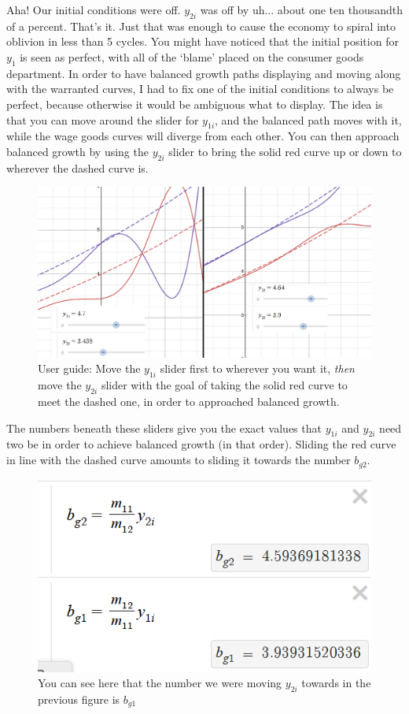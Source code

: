 \documentclass{article}
\theoremstyle{theorem}
\begin{document}
Aha! Our initial conditions were off. $y_{2i}$ was off by uh... about one ten thousandth of a percent. That's it. Just that was enough to cause the economy to spiral into oblivion in less than 5 cycles. You might have noticed that the initial position for $y_1$ is seen as perfect, with all of the `blame' placed on the consumer goods department. In order to have balanced growth paths displaying and moving along with the warranted curves, I had to fix one of the initial conditions to always be perfect, because otherwise it would be ambiguous what to display. The idea is that you can move around the slider for $y_{1i}$, and the balanced path moves with it, while the wage goods curves will diverge from each other. You can then approach balanced growth by using the $y_{2i}$ slider to bring the solid red curve up or down to wherever the dashed curve is. 
 \begin{figure}[H]
\centering
\includegraphics[scale=.6]{Images/liningUp}
\caption{User guide: Move the $y_{1i}$ slider first to wherever you want it, \emph{then} move the $y_{2i}$ slider with the goal of taking the solid red curve to meet the dashed one, in order to approached balanced growth.}
\end{figure}
The numbers beneath these sliders give you the exact values that $y_{1i}$ and $y_{2i}$ need two be in order to achieve balanced growth (in that order). Sliding the red curve in line with the dashed curve amounts to sliding it towards the number $b_{g2}$.
\begin{figure}[H]
\centering
\includegraphics[scale=.7]{Images/initSliders}
\caption{You can see here that the number we were moving $y_{2i}$ towards in the previous figure is $b_{g1}$}
\end{figure}
\end{document}
